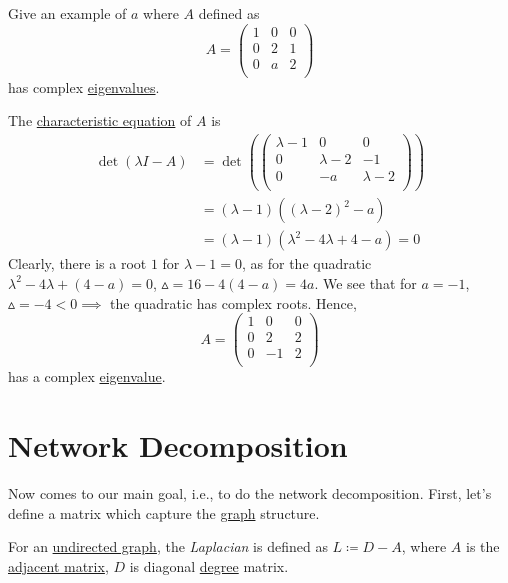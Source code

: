 \begin{eg}
	Give an example of \(a\) where \(A\) defined as
	\[
		A = \begin{pmatrix}
			1 & 0 & 0 \\
			0 & 2 & 1 \\
			0 & a & 2 \\
		\end{pmatrix}
	\]
	has complex \hyperref[def:eigenvalue]{eigenvalues}.
\end{eg}
\begin{explanation}
	The \hyperref[note:characteristic-equation]{characteristic equation} of \(A\) is
	\[
		\begin{split}
			\det(\lambda I - A) &= \det \left(  \begin{pmatrix}
				\lambda - 1 & 0            & 0             \\
				0           & \lambda -  2 & -1            \\
				0           & -a           & \lambda -   2 \\
			\end{pmatrix}\right)\\
			&= (\lambda - 1)((\lambda - 2 )^2 - a)\\
			&= (\lambda - 1)(\lambda^2 - 4\lambda + 4 - a) = 0
		\end{split}
	\]
	Clearly, there is a root \(1\) for \(\lambda - 1 = 0\), as for the quadratic \(\lambda^2 - 4\lambda + (4 - a) = 0\),
	\(\vartriangle = 16 - 4(4-a) = 4a\).
	We see that for \(a = -1\), \(\vartriangle = -4 < 0 \implies\) the quadratic has complex roots. Hence,
	\[
		A = \begin{pmatrix}
			1 & 0  & 0 \\
			0 & 2  & 2 \\
			0 & -1 & 2 \\
		\end{pmatrix}
	\]
	has a complex \hyperref[def:eigenvalue]{eigenvalue}.
\end{explanation}

\section{Network Decomposition}\label{sec:network-decomposition}
Now comes to our main goal, i.e., to do the network decomposition. First, let's define a matrix which capture the \hyperref[def:graph]{graph}
structure.
\begin{definition}[Laplacian]\label{def:Laplacian}
	For an \hyperref[def:undirected-graph]{undirected graph}, the \emph{Laplacian} is defined as \(L \coloneqq D - A\), where \(A\) is the \hyperref[def:adjacency-matrix]{adjacent matrix},
	\(D\) is diagonal \hyperref[def:degree]{degree} matrix.
\end{definition}

